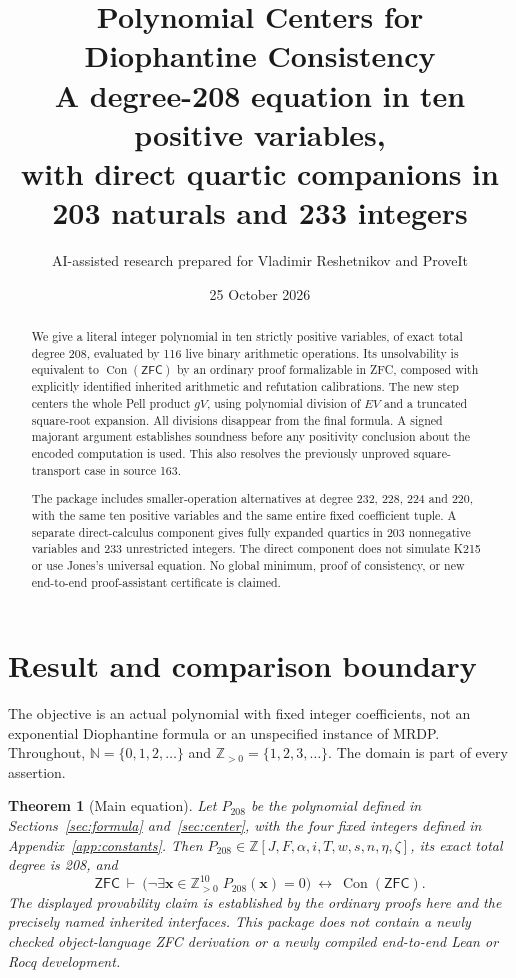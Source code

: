 \documentclass[11pt]{article}
\title{Polynomial Centers for Diophantine Consistency\\[0.4em]
\large A degree-208 equation in ten positive variables,\\
with direct quartic companions in 203 naturals and 233 integers}
\author{AI-assisted research prepared for Vladimir Reshetnikov and ProveIt}
\date{25 October 2026}
\newtheorem{theorem}{Theorem}[section]
\theoremstyle{remark}\newtheorem{remark}[theorem]{Remark}
\newcommand{\Z}{\mathbb Z}\newcommand{\N}{\mathbb N}
\newcommand{\Pos}{\mathbb Z_{>0}}
\newcommand{\Con}{\operatorname{Con}}
\newcommand{\ZFC}{\mathsf{ZFC}}\newcommand{\ZF}{\mathsf{ZF}}
\newcommand{\PrimaryOps}{116}
\begin{document}
\maketitle
\begin{abstract}
We give a literal integer polynomial in ten strictly positive variables,
of exact total degree 208, evaluated by \PrimaryOps{} live binary arithmetic
operations. Its unsolvability is equivalent to $\Con(\ZFC)$ by an ordinary
proof formalizable in ZFC, composed with explicitly identified inherited
arithmetic and refutation calibrations. The new step centers the whole Pell
product $gV$, using polynomial division of $EV$ and a truncated square-root
expansion. All divisions disappear from the final formula. A signed
majorant argument establishes soundness before any positivity conclusion
about the encoded computation is used. This also resolves the previously
unproved square-transport case in source 163.

The package includes smaller-operation alternatives at degree 232, 228,
224 and 220, with the same ten positive variables and the same entire
fixed coefficient tuple. A separate direct-calculus component gives fully
expanded quartics in 203 nonnegative variables and 233 unrestricted
integers. The direct component does not simulate K215 or use Jones's
universal equation. No global minimum, proof of consistency, or new
end-to-end proof-assistant certificate is claimed.
\end{abstract}
\clearpage
\setcounter{tocdepth}{1}
\tableofcontents
\clearpage

\section{Result and comparison boundary}

The objective is an actual polynomial with fixed integer coefficients,
not an exponential Diophantine formula or an unspecified instance of MRDP.
Throughout, $\N=\{0,1,2,\ldots\}$ and $\Pos=\{1,2,3,\ldots\}$.
The domain is part of every assertion.

\begin{theorem}[Main equation]\label{thm:main}
Let $P_{208}$ be the polynomial defined in Sections~\ref{sec:formula}
and~\ref{sec:center}, with the four fixed integers defined in
Appendix~\ref{app:constants}. Then $P_{208}\in\Z[J,F,\alpha,i,T,w,s,n,\eta,\zeta]$,
its exact total degree is 208, and
\[
 \ZFC\ \vdash\
 \bigl(\neg\exists\mathbf x\in\Pos^{10}\;P_{208}(\mathbf x)=0\bigr)
 \ \longleftrightarrow\ \Con(\ZFC).
\]
The displayed provability claim is established by the ordinary proofs here and
the precisely named inherited interfaces. This package does not contain
a newly checked object-language ZFC derivation or a newly compiled
end-to-end Lean or Rocq development.
\end{theorem}
\end{document}
